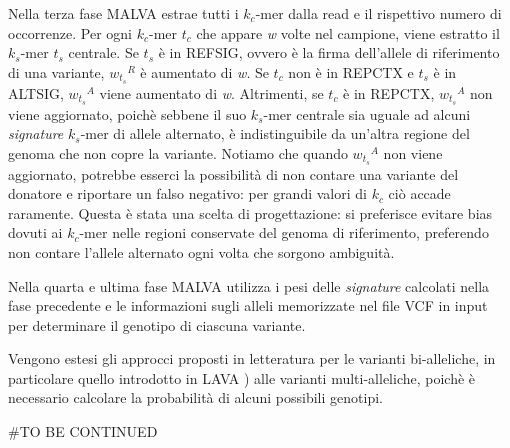 \documentclass[../main.tex]{subfiles}
\begin{document}
Nella terza fase MALVA estrae tutti i  \textit{${k}_{c}$}-mer dalla read e il rispettivo numero di occorrenze. Per ogni  \textit{${k}_{c}$}-mer  \textit{${t}_{c}$} che appare \textit{w} volte nel campione, viene estratto il  \textit{${k}_{s}$}-mer  \textit{${t}_{s}$} centrale. Se  \textit{${t}_{s}$} è in REFSIG, ovvero è la firma dell'allele di riferimento di una variante, \textit{${w_{{t}_{s}}}^{R}$} è aumentato di \textit{w}. Se  \textit{${t}_{c}$} non è in REPCTX e  \textit{${t}_{s}$} è in ALTSIG, \textit{${w_{{t}_{s}}}^{A}$} viene aumentato di \textit{w}. Altrimenti, se  \textit{${t}_{c}$} è in REPCTX, \textit{${w_{{t}_{s}}}^{A}$} non viene aggiornato, poichè sebbene il suo \textit{${k}_{s}$}-mer centrale sia uguale ad alcuni \textit{signature}  \textit{${k}_{s}$}-mer di allele alternato, è indistinguibile da un'altra regione del genoma che non copre la variante. Notiamo che quando \textit{${w_{{t}_{s}}}^{A}$} non viene aggiornato, potrebbe esserci la possibilità di non contare una variante del donatore e riportare un falso negativo: per grandi valori di  \textit{${k}_{c}$} ciò accade raramente. Questa è stata una scelta di progettazione: si preferisce evitare bias dovuti ai  \textit{${k}_{c}$}-mer nelle regioni conservate del genoma di riferimento, preferendo non contare l'allele alternato ogni volta che sorgono ambiguità.

Nella quarta e ultima fase MALVA utilizza i pesi delle \textit{signature} calcolati nella fase precedente e le informazioni sugli alleli memorizzate nel file VCF in input per determinare il genotipo di ciascuna variante.



Vengono estesi gli approcci proposti in letteratura per le varianti bi-alleliche, in particolare quello introdotto in LAVA \cite{shajii2016lava}) alle varianti multi-alleliche, poichè è necessario calcolare la probabilità di alcuni possibili genotipi.


#TO BE CONTINUED









\end{document}
